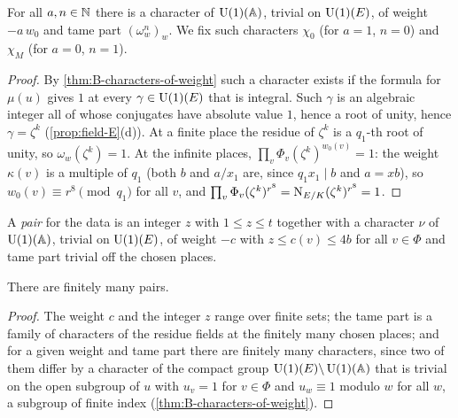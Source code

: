 \begin{proposition}\label{prop:characters-of-weight}
For all $a,n\in\mathbb{N}$ there is a character of $\operatorname{U}(1)(\mathbb{A})$, trivial on $\operatorname{U}(1)(E)$, of weight
$-a\,w_0$ and tame part $(\omega_w^n)_w$. We fix such characters $\chi_0$ (for $a=1$, $n=0$) and
$\chi_M$ (for $a=0$, $n=1$).
\end{proposition}

\begin{proof}
By \cref{thm:B-characters-of-weight} such a character exists if the formula for $\mu(u)$ gives $1$
at every $\gamma\in\operatorname{U}(1)(E)$ that is integral. Such $\gamma$ is an algebraic integer all of whose
conjugates have absolute value $1$, hence a root of unity, hence $\gamma=\zeta^k$
(\cref{prop:field-E}(d)). At a finite place the residue of $\zeta^k$ is a $q_1$-th root of unity, so
$\omega_w(\zeta^k)=1$. At the infinite places,
$\prod_v\Phi_v(\zeta^k)^{w_0(v)}=1$: the weight $\kappa(v)$ is a multiple of $q_1$ (both $b$ and
$a/x_1$ are, since $q_1x_1\mid b$ and $a=xb$), so $w_0(v)\equiv r^8\pmod{q_1}$ for all $v$, and
$\prod_v\Phi_v(\zeta^k)^{r^8}=\operatorname{N}_{E/K}(\zeta^k)^{r^8}=1$.
\end{proof}

\begin{definition}\label{def:critical-pair}
A \emph{pair} for the data is an integer $z$ with $1\le z\le t$ together with a character $\nu$ of
$\operatorname{U}(1)(\mathbb{A})$, trivial on $\operatorname{U}(1)(E)$, of weight $-c$ with $z\le c(v)\le4b$ for all $v\in\Phi$ and
tame part trivial off the chosen places.
\end{definition}

\begin{proposition}\label{prop:finite-pairs}
There are finitely many pairs.
\end{proposition}

\begin{proof}
The weight $c$ and the integer $z$ range over finite sets; the tame part is a family of characters of
the residue fields at the finitely many chosen places; and for a given weight and tame part there are
finitely many characters, since two of them differ by a character of the compact group
$\operatorname{U}(1)(E)\backslash\operatorname{U}(1)(\mathbb{A})$ that is trivial on the open subgroup of $u$ with $u_v=1$ for $v\in\Phi$
and $u_w\equiv1$ modulo $w$ for all $w$, a subgroup of finite index
(\cref{thm:B-characters-of-weight}).
\end{proof}
